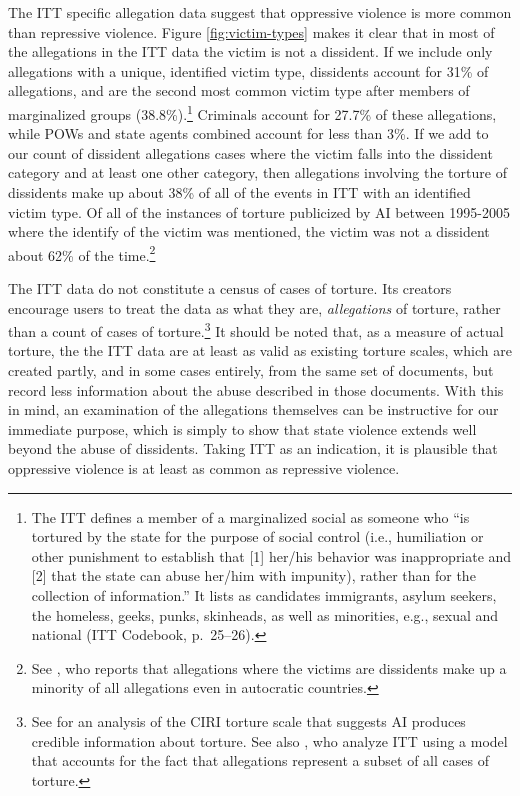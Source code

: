 \documentclass[11pt]{article}
\begin{document}
The ITT specific allegation data suggest that oppressive violence is more common than repressive violence. Figure \ref{fig:victim-types} makes it clear that in most of the allegations in the ITT data the victim is not a dissident. If we include only allegations with a unique, identified victim type, dissidents account for 31\% of allegations, and are the second most common victim type after members of marginalized groups (38.8\%).\footnote{The ITT defines a member of a marginalized social as someone who ``is tortured by the state for the purpose of social control (i.e., humiliation or other punishment to establish that [1] her/his behavior was inappropriate and [2] that the state can abuse her/him with impunity), rather than for the collection of information.'' It lists as candidates immigrants, asylum seekers, the homeless, geeks, punks, skinheads, as well as minorities, e.g., sexual and national (ITT Codebook, p.\ 25--26).} Criminals account for 27.7\% of these allegations, while POWs and state agents combined account for less than 3\%. If we add to our count of dissident allegations cases where the victim falls into the dissident category and at least one other category, then allegations involving the torture of dissidents make up about 38\% of all of the events in ITT with an identified victim type. Of all of the instances of torture publicized by AI between 1995-2005 where the identify of the victim was mentioned, the victim was not a dissident about 62\% of the time.\footnote{See \citet[][pp.\ 3-4]{Haschke2018}, who reports that allegations where the victims are dissidents make up a minority of all allegations even in autocratic countries.} 

The ITT data do not constitute a census of cases of torture. Its creators encourage users to treat the data as what they are, {\em allegations} of torture, rather than a count of cases of torture.\footnote{See \citet{HillMooreMukherjee2013} for an analysis of the CIRI torture scale that suggests AI produces credible information about torture. See also \citet{ConradHillMoore2018}, who analyze ITT using a model that accounts for the fact that allegations represent a subset of all cases of torture.} It should be noted that, as a measure of actual torture, the the ITT data are at least as valid as existing torture scales, which are created partly, and in some cases entirely, from the same set of documents, but record less information about the abuse described in those documents. With this in mind, an examination of the allegations themselves can be instructive for our immediate purpose, which is simply to show that state violence extends well beyond the abuse of dissidents. Taking ITT as an indication, it is plausible that oppressive violence is at least as common as repressive violence. 
\end{document}
